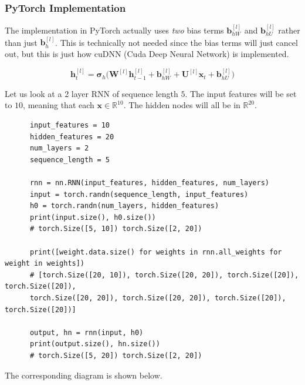 \documentclass{article}
\begin{document}
  \subsubsection{PyTorch Implementation}

    The implementation in PyTorch actually uses \textit{two} bias terms $\mathbf{b}_{hW}^{[l]}$ and $\mathbf{b}_{hU}^{[l]}$ rather than just $\mathbf{b}_h^{[l]}$. This is technically not needed since the bias terms will just cancel out, but this is just how cuDNN (Cuda Deep Neural Network) is implemented. 

    \begin{equation}
      \mathbf{h}_t^{[l]} = \boldsymbol{\sigma}_h \big( \mathbf{W}^{[l]} \mathbf{h}_{t-1}^{[l]} + \mathbf{b}_{hW}^{[l]} + \mathbf{U}^{[l]} \mathbf{x}_t + \mathbf{b}_{hU}^{[l]} \big)
    \end{equation}

    Let us look at a 2 layer RNN of sequence length $5$. The input features will be set to $10$, meaning that each $\mathbf{x} \in \mathbb{R}^{10}$. The hidden nodes will all be in $\mathbb{R}^{20}$. 

    \begin{lstlisting}
      input_features = 10
      hidden_features = 20
      num_layers = 2
      sequence_length = 5

      rnn = nn.RNN(input_features, hidden_features, num_layers)
      input = torch.randn(sequence_length, input_features)
      h0 = torch.randn(num_layers, hidden_features)
      print(input.size(), h0.size()) 
      # torch.Size([5, 10]) torch.Size([2, 20])

      print([weight.data.size() for weights in rnn.all_weights for weight in weights])
      # [torch.Size([20, 10]), torch.Size([20, 20]), torch.Size([20]), torch.Size([20]), 
      torch.Size([20, 20]), torch.Size([20, 20]), torch.Size([20]), torch.Size([20])]
              
      output, hn = rnn(input, h0) 
      print(output.size(), hn.size())
      # torch.Size([5, 20]) torch.Size([2, 20])
    \end{lstlisting}

    The corresponding diagram is shown below. 
\end{document}
